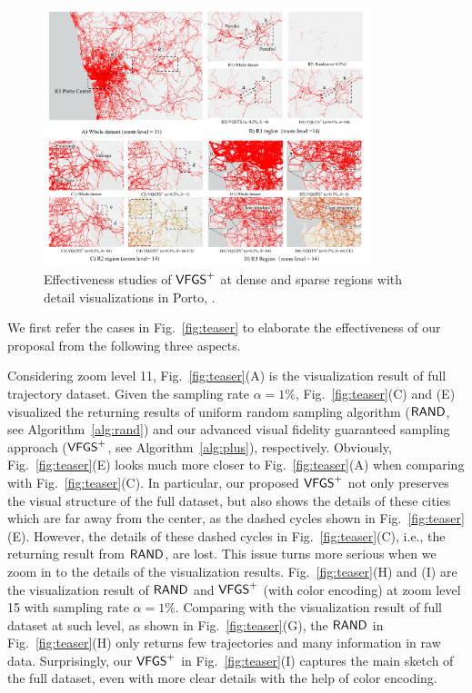 \begin{figure}[t]
	\centering
	\includegraphics[width=0.85\textwidth]{pictures/experiment_study/case_porto.pdf}
	\vspace{-3mm}
	\caption{Effectiveness studies of $\mathsf{VFGS}^{+}$ at dense and sparse regions with detail visualizations in Porto, .}
	\label{fig:porto}
    \vspace{-6mm}
\end{figure}

We first refer the cases in Fig.~\ref{fig:teaser} to elaborate the effectiveness of our proposal from the following three aspects.

Considering zoom level 11, Fig.~\ref{fig:teaser}(A) is the visualization result of full \pt{} trajectory dataset.
Given the sampling rate $\alpha = 1\%$, Fig.~\ref{fig:teaser}(C) and (E) visualized the returning results of uniform random sampling algorithm ($\mathsf{RAND}$, see Algorithm~\ref{alg:rand})
and our advanced visual fidelity guaranteed sampling approach ($\mathsf{VFGS}^{+}$, see Algorithm~\ref{alg:plus}), respectively.
Obviously, Fig.~\ref{fig:teaser}(E) looks much more closer to Fig.~\ref{fig:teaser}(A) when comparing with Fig.~\ref{fig:teaser}(C).
In particular, our proposed $\mathsf{VFGS}^{+}$ not only preserves the visual structure of the full dataset,
but also shows the details of these cities which are far away from the center, as the dashed cycles shown in Fig.~\ref{fig:teaser}(E).
However, the details of these dashed cycles in Fig.~\ref{fig:teaser}(C), i.e., the returning result from $\mathsf{RAND}{}$, are lost.
This issue turns more serious when we zoom in to the details of the visualization results.
Fig.~\ref{fig:teaser}(H) and (I) are the visualization result of $\mathsf{RAND}$ and $\mathsf{VFGS}^{+}$  (with color encoding) at zoom level 15 with sampling rate $\alpha=1\%$.
Comparing with the visualization result of full dataset at such level, as shown in Fig.~\ref{fig:teaser}(G),
the $\mathsf{RAND}{}$ in Fig.~\ref{fig:teaser}(H) only returns few trajectories and many information in raw data.
Surprisingly, our $\mathsf{VFGS}^{+}$ in Fig.~\ref{fig:teaser}(I) captures the main sketch of the full dataset, even with more clear details with the help of color encoding.


